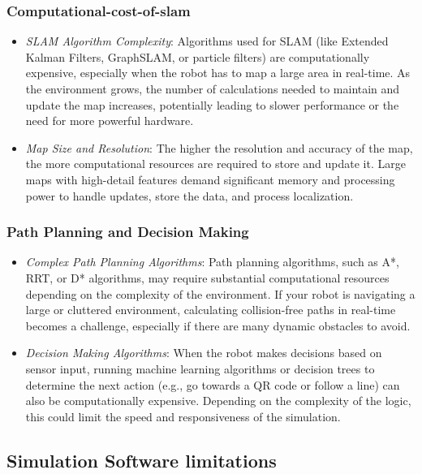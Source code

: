\documentclass[../../main]{subfiles}
\begin{document}
    \subsubsection{Computational-cost-of-slam}

    \begin{itemize}
    \item
      \emph{SLAM Algorithm Complexity}: Algorithms used for SLAM (like
      Extended Kalman Filters, GraphSLAM, or particle filters) are
      computationally expensive, especially when the robot has to map a
      large area in real-time. As the environment grows, the number of
      calculations needed to maintain and update the map increases,
      potentially leading to slower performance or the need for more
      powerful hardware.
    \item
      \emph{Map Size and Resolution}: The higher the resolution and
      accuracy of the map, the more computational resources are required to
      store and update it. Large maps with high-detail features demand
      significant memory and processing power to handle updates, store the
      data, and process localization.
    \end{itemize}
    
    \subsubsection{Path Planning and Decision Making}
    \begin{itemize}
    \item
      \emph{Complex Path Planning Algorithms}: Path planning algorithms,
      such as A*, RRT, or D* algorithms, may require substantial
      computational resources depending on the complexity of the
      environment. If your robot is navigating a large or cluttered
      environment, calculating collision-free paths in real-time becomes a
      challenge, especially if there are many dynamic obstacles to avoid.
    \item
      \emph{Decision Making Algorithms}: When the robot makes decisions
      based on sensor input, running machine learning algorithms or decision
      trees to determine the next action (e.g., go towards a QR code or
      follow a line) can also be computationally expensive. Depending on the
      complexity of the logic, this could limit the speed and responsiveness
      of the simulation.
    \end{itemize}
    
    \subsection{Simulation Software limitations}
    
\end{document}
